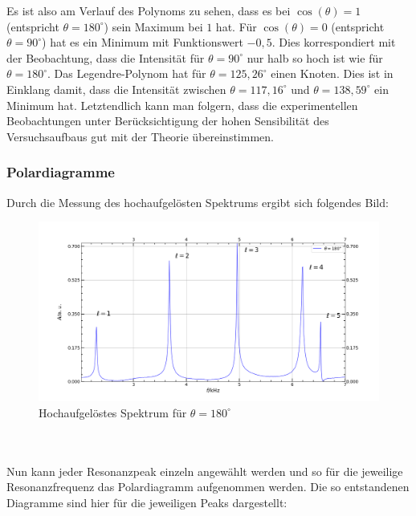 \documentclass[german,  %
parskip=full,  %
]{scrartcl}
\begin{document}
Es ist also am Verlauf des Polynoms zu sehen, dass es bei $\cos(\theta)=1$ (entspricht $\theta = 180^{\circ}$) sein Maximum bei $1$ hat. Für $\cos(\theta)=0$ (entspricht $\theta = 90^{\circ}$) hat es ein Minimum mit Funktionswert $-0,5$. Dies korrespondiert mit der Beobachtung, dass die Intensität für $\theta = 90^{\circ}$ nur halb so hoch ist wie für $\theta = 180^{\circ}$. Das Legendre-Polynom hat für $\theta = 125,26^{\circ}$ einen Knoten. Dies ist in Einklang damit, dass die Intensität zwischen $\theta=117,16^{\circ}$ und $\theta=138,59^{\circ}$ ein Minimum hat.
\newline Letztendlich kann man folgern, dass die experimentellen Beobachtungen unter Berücksichtigung der hohen Sensibilität des Versuchsaufbaus gut mit der Theorie übereinstimmen.
\newpage
\subsubsection{Polardiagramme}
Durch die Messung des hochaufgelösten Spektrums ergibt sich folgendes Bild: 
\begin{figure}[h!]
\centering
\includegraphics[width=\textwidth]{4321.png}
\caption{Hochaufgelöstes Spektrum für $\theta = 180^{\circ}$}
\end{figure} \\\\
Nun kann jeder Resonanzpeak einzeln angewählt werden und so für die jeweilige Resonanzfrequenz das Polardiagramm aufgenommen werden. Die so entstandenen Diagramme sind hier für die jeweiligen Peaks dargestellt:\\\\
\end{document}
